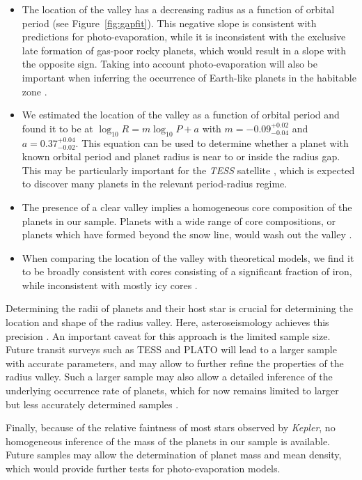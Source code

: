 \documentclass[a4paper,fleqn,usenatbib]{mnras}
\begin{document}
\begin{itemize}
 \item The location of the valley has a decreasing radius as a function of orbital period (see Figure~\ref{fig:gapfit}). This negative slope is consistent with predictions for photo-evaporation, while it is inconsistent with the exclusive late formation of gas-poor rocky planets, which would result in a slope with the opposite sign. Taking into account photo-evaporation will also be important when inferring the occurrence of Earth-like planets in the habitable zone \citep{lopez2016}.
 \item We estimated the location of the valley as a function of orbital period and found it to be at $\log_{10} R = m \log_{10} P + a$ with $m = {-0.09^{+0.02}_{-0.04}} $ and $a = 0.37^{+0.04}_{-0.02}$. This equation can be used to determine whether a planet with known orbital period and planet radius is near to or inside the radius gap. This may be particularly important for the \textit{TESS} satellite \citep{ricker2014}, which is expected to discover many planets in the relevant period-radius regime.
 \item The presence of a clear valley implies a homogeneous core composition of the planets in our sample. Planets with a wide range of core compositions, or planets which have formed beyond the snow line, would wash out the valley \citep{owen2017}. 
 \item When comparing the location of the valley with theoretical models, we find it to be broadly consistent with cores consisting of a significant fraction of iron, while inconsistent with mostly icy cores \citep{owen2017,jin2018}.
\end{itemize}

Determining the radii of planets and their host star is crucial for determining the location and shape of the radius valley. Here, asteroseismology achieves this precision \citep{silvaaguirre2015,lundkvist2016}. An important caveat for this approach is the limited sample size. Future transit surveys such as TESS and PLATO \citep{rauer2014} will lead to a larger sample with accurate parameters, and may allow to further refine the properties of the radius valley. Such a larger sample may also allow a detailed inference of the underlying occurrence rate of planets, which for now remains limited to larger but less accurately determined samples \citep{fulton2017}. 

Finally, because of the relative faintness of most stars observed by \textit{Kepler}, no homogeneous inference of the mass of the planets in our sample is available. Future samples may allow the determination of planet mass and mean density, which would provide further tests for photo-evaporation models.	
\end{document}
